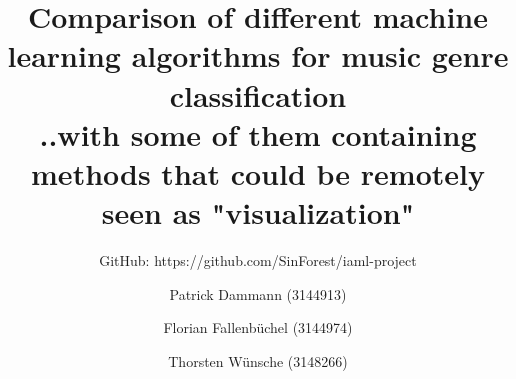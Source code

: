 \documentclass[]{scrreprt}
\title{Comparison of different machine learning algorithms for music genre classification\\ \tiny ..with some of them containing methods that could be remotely seen as "visualization"}
\subtitle{GitHub: https://github.com/SinForest/iaml-project}
\author{Patrick Dammann (3144913) \and Florian Fallenbüchel (3144974) \and Thorsten Wünsche (3148266)}
\begin{document}
\maketitle

\begin{abstract}
\end{abstract}

\tableofcontents










\end{document}
